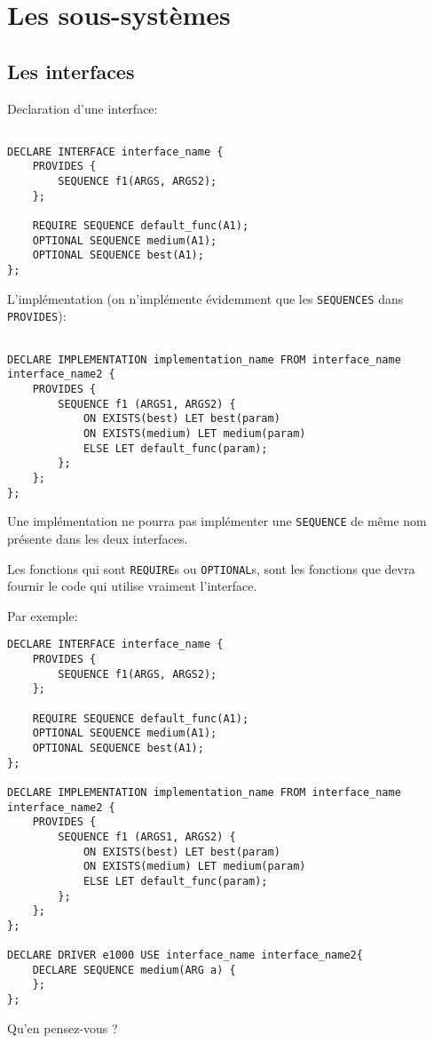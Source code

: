 \documentclass{rtxreport}
\begin{document}
\chapter{Les sous-systèmes}

\section{Les interfaces}

Declaration d'une interface\footnotemark[3]\footnotemark[4] :

\begin{lstlisting}

DECLARE INTERFACE interface_name {
	PROVIDES {
		SEQUENCE f1(ARGS, ARGS2);
	};

	REQUIRE SEQUENCE default_func(A1);
	OPTIONAL SEQUENCE medium(A1);
	OPTIONAL SEQUENCE best(A1);
};

\end{lstlisting}

L’implémentation (on n’implémente évidemment que les \texttt{SEQUENCES}
dans \texttt{PROVIDES})\footnotemark[5] :
\begin{lstlisting}

DECLARE IMPLEMENTATION implementation_name FROM interface_name interface_name2 {
	PROVIDES {
		SEQUENCE f1 (ARGS1, ARGS2) {
			ON EXISTS(best) LET best(param)
			ON EXISTS(medium) LET medium(param)
			ELSE LET default_func(param);
		};
	};
};
\end{lstlisting}
Une implémentation ne pourra pas implémenter une \texttt{SEQUENCE} de même nom
présente dans les deux interfaces.

Les fonctions qui sont \texttt{REQUIRE}s ou \texttt{OPTIONAL}s, sont les
fonctions que devra fournir le code qui utilise vraiment l’interface.
\footnotemark[6]

Par exemple:

\begin{lstlisting}
DECLARE INTERFACE interface_name {
	PROVIDES {
		SEQUENCE f1(ARGS, ARGS2);
	};

	REQUIRE SEQUENCE default_func(A1);
	OPTIONAL SEQUENCE medium(A1);
	OPTIONAL SEQUENCE best(A1);
};

DECLARE IMPLEMENTATION implementation_name FROM interface_name interface_name2 {
	PROVIDES {
		SEQUENCE f1 (ARGS1, ARGS2) {
			ON EXISTS(best) LET best(param)
			ON EXISTS(medium) LET medium(param)
			ELSE LET default_func(param);
		};
	};
};

DECLARE DRIVER e1000 USE interface_name interface_name2{
	DECLARE SEQUENCE medium(ARG a) {
	};
};
\end{lstlisting}
Qu’en pensez-vous ?
\end{document}
